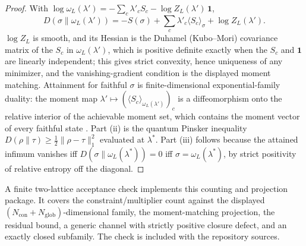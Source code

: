 \documentclass[11pt]{article}
\begin{document}
\begin{proof}
With \(\log\omega_L(\lambda')=-\sum_c\lambda'_c S_c-\log Z_L(\lambda')\,\mathbf 1\),
\[
D(\sigma\|\omega_L(\lambda'))=-S(\sigma)+\sum_c\lambda'_c\langle S_c\rangle_\sigma+\log Z_L(\lambda').
\]
\(\log Z_L\) is smooth, and its Hessian is the Duhamel (Kubo--Mori) covariance matrix of the \(S_c\) in \(\omega_L(\lambda')\), which is positive definite exactly when the \(S_c\) and \(\mathbf 1\) are linearly independent; this gives strict convexity, hence uniqueness of any minimizer, and the vanishing-gradient condition is the displayed moment matching. Attainment for faithful \(\sigma\) is finite-dimensional exponential-family duality: the moment map \(\lambda'\mapsto(\langle S_c\rangle_{\omega_L(\lambda')})_c\) is a diffeomorphism onto the relative interior of the achievable moment set, which contains the moment vector of every faithful state \cite{wichmann63}. Part (ii) is the quantum Pinsker inequality \(D(\rho\|\tau)\ge\tfrac12\|\rho-\tau\|_1^2\) \cite{hiaiOhyaTsukada81} evaluated at \(\lambda^\ast\). Part (iii) follows because the attained infimum vanishes iff \(D(\sigma\|\omega_L(\lambda^\ast))=0\) iff \(\sigma=\omega_L(\lambda^\ast)\), by strict positivity of relative entropy off the diagonal.
\end{proof}

A finite two-lattice acceptance check implements this counting and projection package. It covers the constraint/multiplier count against the displayed \((N_{\mathrm{con}}+N_{\mathrm{glob}})\)-dimensional family, the moment-matching projection, the residual bound, a generic channel with strictly positive closure defect, and an exactly closed subfamily. The check is included with the repository sources.
\end{document}
